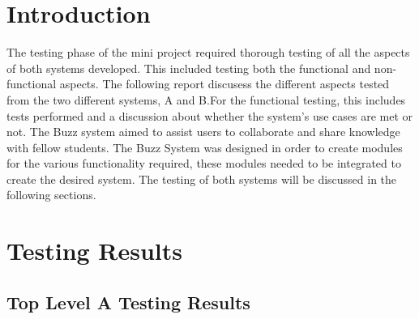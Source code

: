 \documentclass[hidelinks, 12pt, oneside]{article}
\begin{document}
\tableofcontents

\newpage

\section{Introduction}
The testing phase of the mini project required thorough testing of all the aspects of both systems developed. This included testing both the functional and non-functional aspects. The following report discusess the different aspects tested from the two different systems, A and B.For the functional testing, this includes tests performed and a discussion about whether the system's use cases are met or not. The Buzz system aimed to assist users to collaborate and share knowledge with fellow students. The Buzz System was designed in order to create modules for the various functionality required, these modules needed to be integrated to create the desired system. The testing of both systems will be discussed in the following sections.

\section{Testing Results}
\subsection{Top Level A Testing Results}
\end{document}
